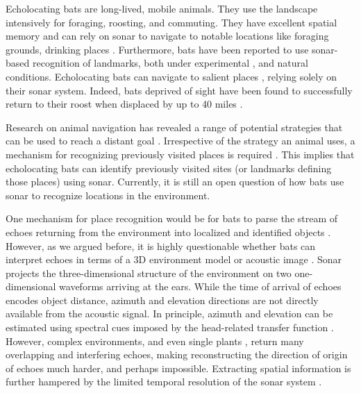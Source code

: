 \documentclass[preprint,5p]{elsarticle}
\begin{document}
Echolocating bats are long-lived, mobile animals. They use the landscape intensively for foraging, roosting, and commuting. They have excellent spatial memory \citep{Barchi2013,VonHelversen2005} and can rely on sonar to navigate to notable locations like foraging grounds, drinking places \citep[see][for references]{Vanderelst2016,Vanderelst2017}. Furthermore, bats have been reported to use sonar-based recognition of landmarks, both under experimental \citep{Jensen2005,Yu2019}, and natural \citep{Verboom1999} conditions. Echolocating bats can navigate to salient places \citep{Schnitzler2003}, relying solely on their sonar system. Indeed, bats deprived of sight have been found to successfully return to their roost when displaced by up to 40 miles \citep{Stones1969,Williams1966,Davis1970,Mueller1957}.

Research on animal navigation has revealed a range of potential strategies that can be used to reach a distant goal \citep[Reviewed by][]{Franz2000}. Irrespective of the strategy an animal uses, a mechanism for recognizing previously visited places is required \citep{Vanderelst2016,Vanderelst2017}. This implies that echolocating bats can identify previously visited sites (or landmarks defining those places) using sonar. Currently, it is still an open question of how bats use sonar to recognize locations in the environment.

One mechanism for place recognition would be for bats to parse the stream of echoes returning from the environment into localized and identified objects \citep{Lee2017,Barchi2013,Moss2001,Schnitzler2003,Simmons2012,Ulanovsky2008,Clare2015,Surlykke2016,Geipel2013}. However, as we argued before, it is highly questionable whether bats can interpret echoes in terms of a 3D environment model or acoustic image \citep[e.g.,][]{Vanderelst2015,Vanderelst2016,Steckel2013}. Sonar projects the three-dimensional structure of the environment on two one-dimensional waveforms arriving at the ears. While the time of arrival of echoes encodes object distance, azimuth and elevation directions are not directly available from the acoustic signal. In principle, azimuth and elevation can be estimated using spectral cues imposed by the head-related transfer function \citep[e.g.,][]{Reijniers2010,Aytekin2004}. However, complex environments, and even single plants \citep{Yovel2008,Muller2000}, return many overlapping and interfering echoes, making reconstructing the direction of origin of echoes much harder, and perhaps impossible. Extracting spatial information is further hampered by the limited temporal resolution of the sonar system \citep{Simmons1989,Wiegrebe1996,Surlykke1996}. 
\end{document}

